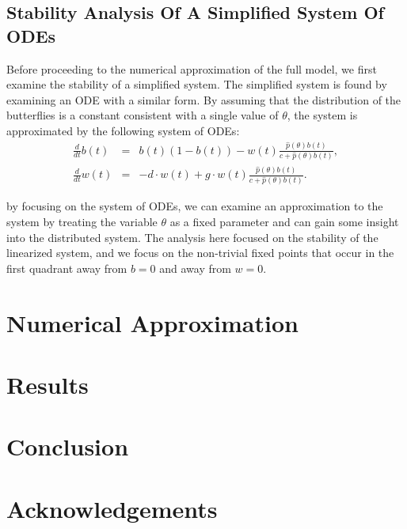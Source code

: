 \documentclass[12pt]{article}
\begin{document}
\subsection{Stability Analysis Of A Simplified System Of ODEs}

Before proceeding to the numerical approximation of the full model, we
first examine the stability of a simplified system. The simplified
system is found by examining an ODE with a similar form. By assuming
that the distribution of the butterflies is a constant consistent with
a single value of $\theta$, the system is approximated by the
following system of ODEs:
\begin{eqnarray}
  \label{eq:scaledODE1}
  \frac{d}{dt} b(t) & = &
      b(t) (1 - b(t))
      -  w(t) \frac{\hat{p}(\theta) b(t)}{c+\hat{p}(\theta)b(t)}, \\
  \label{eq:scaledODE2}
  \frac{d}{dt} w(t) & = & -d \cdot w(t) +
       g \cdot w(t) \frac{\hat{p}(\theta) b(t) }{c + \hat{p}(\theta) b(t)}.
\end{eqnarray}

by focusing on the system of ODEs, we can examine an approximation to
the system by treating the variable $\theta$ as a fixed parameter and
can gain some insight into the distributed system. The analysis here
focused on the stability of the linearized system, and we focus on the
non-trivial fixed points that occur in the first quadrant away from
$b=0$ and away from $w=0$.

\section{Numerical Approximation}

\section{Results}

\section{Conclusion}

\section{Acknowledgements}
\end{document}
